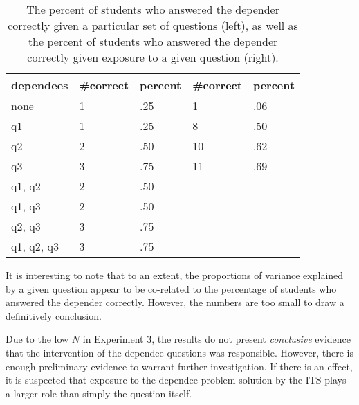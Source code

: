 \begin{table}[t]
\caption{ The percent of students who answered the depender correctly
given a particular set of questions (left), as well as the percent of students
who answered the depender correctly given exposure to a given question (right).}
\vspace{12pt}
\begin{tabularx}{\textwidth}{|X|X|X|X|X|}
\hline
\y dependees    & \y \#correct &  \y percent & \y \#correct & \y percent \\ \hline
none         &  1  & .25  &1&  .06 \\ \hline
q1           &  1  & .25  &8&  .50 \\ \hline
q2           &  2  & .50  &10& .62 \\ \hline
q3           &  3  & .75  &11& .69 \\ \hline
q1, q2       &  2  & .50  && \\ \hline
q1, q3       &  2  & .50  && \\ \hline
q2, q3       &  3  & .75  && \\ \hline
q1, q2, q3   &  3  & .75  && \\ \hline
\end{tabularx}
\vspace{24pt}
\end{table}

It is interesting to note that to an extent, the proportions of variance
explained by a given question appear to be co-related to the percentage of
students who answered the depender correctly.  However, the numbers are too
small to draw a definitively conclusion.

Due to the low $N$ in Experiment 3, the results do not present
\emph{conclusive} evidence that the intervention of the dependee questions was
responsible.  However, there is enough preliminary evidence to warrant further
investigation.  If there is an effect, it is suspected that exposure to the
dependee problem solution by the ITS plays a larger role than simply the
question itself.


